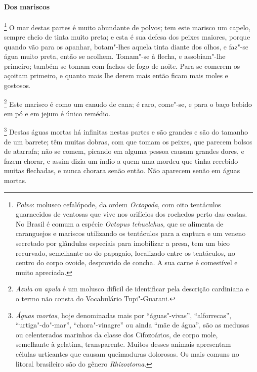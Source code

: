 \begin{linenumbers}
\paragraph{Dos mariscos}\quad
{}\footnote{ \textit{Polvo}: molusco
cefalópode, da ordem \textit{Octopoda}, com oito tentáculos guarnecidos
de ventosas que vive nos orifícios dos rochedos perto das costas. No
Brasil é comum a espécie \textit{Octopus tehuelchus}, que se alimenta
de caranguejos e mariscos utilizando os tentáculos para a captura e um
veneno secretado por glândulas especiais para imobilizar a presa, tem
um bico recurvado, semelhante ao do papagaio, localizado entre os
tentáculos, no centro do corpo ovoide, desprovido de concha. A sua
carne é comestível e muito apreciada.} O mar destas partes
é muito abundante de polvos; tem este marisco um capelo, sempre cheio
de tinta muito preta; e esta é sua defesa dos peixes maiores, porque
quando vão para os apanhar, botam"-lhes aquela tinta diante dos olhos, e
faz"-se água muito preta, então se acolhem. Tomam"-se à flecha, e
assobiam"-lhe primeiro; também se tomam com fachos de fogo de noite.
Para se comerem os açoitam primeiro, e quanto mais lhe derem mais então
ficam mais moles e gostosos.

\footnote{ \textit{Azula} ou \textit{apula} é um
molusco difícil de identificar pela descrição cardiniana e o termo não
consta do Vocabulário Tupi"-Guarani.} Este marisco é como um canudo de cana; 
é raro, come"-se, e para o baço bebido em pó e em jejum é único remédio.

\footnote{ \textit{Águas mortas}, hoje
denominadas mais por ``águas"-vivas'', ``alforrecas'', ``urtiga"-do"-mar'',
``chora"-vinagre'' ou ainda ``mãe de água'', são as medusas ou celenterados
marinhos da classe dos Cifozoários, de corpo mole, semelhante à
gelatina, transparente. Muitos desses animais apresentam células
urticantes que causam queimaduras dolorosas. Os mais comuns no litoral
brasileiro são do gênero \textit{Rhizoztoma}.} Destas águas mortas há 
infinitas nestas partes e são grandes e são do tamanho
de um barrete; têm muitas dobras, com que tomam os peixes, que parecem
bolsos de atarrafa; não se comem, picando em alguma pessoa causam
grandes dores, e fazem chorar, e assim dizia um índio a quem uma mordeu
que tinha recebido muitas flechadas, e nunca chorara senão então. Não
aparecem senão em águas mortas. 



\end{linenumbers}
